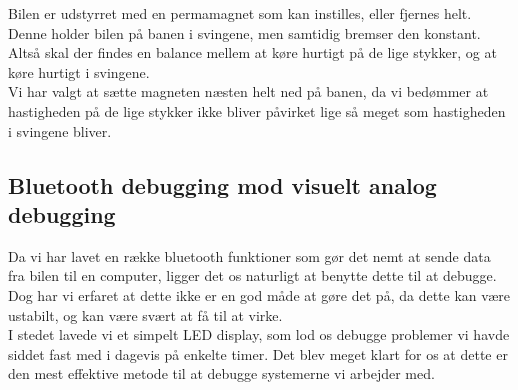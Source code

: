 Bilen er udstyrret med en permamagnet som kan instilles, eller fjernes helt. Denne holder bilen på banen i svingene, men samtidig bremser den konstant. Altså skal der findes en balance mellem at køre hurtigt på de lige stykker, og at køre hurtigt i svingene.
\\
Vi har valgt at sætte magneten næsten helt ned på banen, da vi bedømmer at hastigheden på de lige stykker ikke bliver påvirket lige så meget som hastigheden i svingene bliver.

\subsection{Bluetooth debugging mod visuelt analog debugging}

Da vi har lavet en række bluetooth funktioner som gør det nemt at sende data fra bilen til en computer, ligger det os naturligt at benytte dette til at debugge. Dog har vi erfaret at dette ikke er en god måde at gøre det på, da dette kan være ustabilt, og kan være svært at få til at virke.
\\
I stedet lavede vi et simpelt LED display, som lod os debugge problemer vi havde siddet fast med i dagevis på enkelte timer. Det blev meget klart for os at dette er den mest effektive metode til at debugge systemerne vi arbejder med.